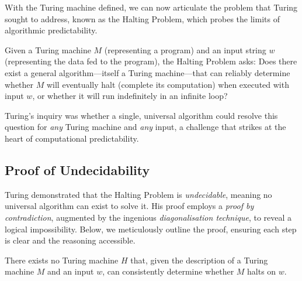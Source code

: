 With the Turing machine defined, we can now articulate the problem that Turing sought to address, known as the Halting Problem, which probes the limits of algorithmic predictability.

\begin{definition}
Given a Turing machine $M$ (representing a program) and an input string $w$ (representing the data fed to the program), the Halting Problem asks: Does there exist a general algorithm---itself a Turing machine---that can reliably determine whether $M$ will eventually halt (complete its computation) when executed with input $w$, or whether it will run indefinitely in an infinite loop?
\end{definition}

Turing's inquiry was whether a single, universal algorithm could resolve this question for \textit{any} Turing machine and \textit{any} input, a challenge that strikes at the heart of computational predictability.


\subsection{Proof of Undecidability}
Turing demonstrated that the Halting Problem is \textit{undecidable}, meaning no universal algorithm can exist to solve it. His proof employs a \textit{proof by contradiction}, augmented by the ingenious \textit{diagonalisation technique}, to reveal a logical impossibility. Below, we meticulously outline the proof, ensuring each step is clear and the reasoning accessible.

\begin{theorem}
There exists no Turing machine $H$ that, given the description of a Turing machine $M$ and an input $w$, can consistently determine whether $M$ halts on $w$.
\end{theorem}

